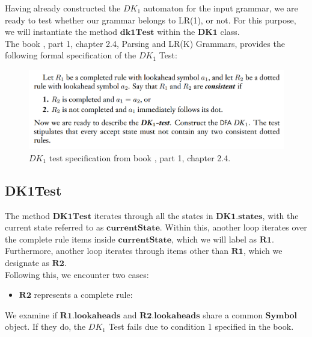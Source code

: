 Having already constructed the \(DK_{1}\) automaton for the input grammar, we are ready to test whether our grammar belongs to LR(1), or not. For this purpose, we will instantiate the method \(\boldsymbol{dk1Test}\) within the \(\boldsymbol{DK1}\) class.\\

The book \cite{sipser}, part 1, chapter 2.4, Parsing and LR(K) Grammars, provides the following formal specification of the \(DK_{1}\) Test:


\begin{figure}[h!]
    \includegraphics[width=\linewidth]{DK1 test conditions.png}
    \caption{\(DK_{1}\) test specification from book \cite{sipser}, part 1, chapter 2.4.}
    \label{figure 4}
\end{figure}


\vspace{15pt}

\subsection{DK1Test}

The method \(\boldsymbol{DK1Test}\) iterates through all the states in \(\boldsymbol{DK1.states}\), with the current state referred to as \(\boldsymbol{currentState}\). Within this, another loop iterates over the complete rule items inside \(\boldsymbol{currentState}\), which we will label as \(\boldsymbol{R1}\). Furthermore, another loop iterates through items other than \(\boldsymbol{R1}\), which we designate as \(\boldsymbol{R2}\).\\

Following this, we encounter two cases:
\begin{itemize}
    \item \(\boldsymbol{R2}\) represents a complete rule:
\end{itemize}

We examine if \(\boldsymbol{R1.lookaheads}\) and \(\boldsymbol{R2.lookaheads}\) share a common \(\boldsymbol{Symbol}\) object. If they do, the \(DK_{1}\) Test fails due to condition 1 specified in the book.


